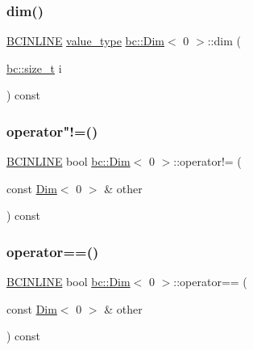 \subsubsection{\texorpdfstring{dim()}{dim()}}
{\footnotesize\ttfamily \hyperlink{common_8h_a6699e8b0449da5c0fafb878e59c1d4b1}{B\+C\+I\+N\+L\+I\+NE} \hyperlink{structbc_1_1Dim_3_010_01_4_a561dbc6acbf3e9fe5c4a06aba2f8b968}{value\+\_\+type} \hyperlink{structbc_1_1Dim}{bc\+::\+Dim}$<$ 0 $>$\+::dim (\begin{DoxyParamCaption}\item[{\hyperlink{namespacebc_aaf8e3fbf99b04b1b57c4f80c6f55d3c5}{bc\+::size\+\_\+t}}]{i }\end{DoxyParamCaption}) const\hspace{0.3cm}{\ttfamily [inline]}}

\mbox{\label{structbc_1_1Dim_3_010_01_4_a288aa95e03c09bae5cffcbbc6885138f}} 
\subsubsection{\texorpdfstring{operator"!=()}{operator!=()}}
{\footnotesize\ttfamily \hyperlink{common_8h_a6699e8b0449da5c0fafb878e59c1d4b1}{B\+C\+I\+N\+L\+I\+NE} bool \hyperlink{structbc_1_1Dim}{bc\+::\+Dim}$<$ 0 $>$\+::operator!= (\begin{DoxyParamCaption}\item[{const \hyperlink{structbc_1_1Dim}{Dim}$<$ 0 $>$ \&}]{other }\end{DoxyParamCaption}) const\hspace{0.3cm}{\ttfamily [inline]}}

\mbox{\label{structbc_1_1Dim_3_010_01_4_a096ffa430a674f7cb389ac9058ecb11b}} 
\subsubsection{\texorpdfstring{operator==()}{operator==()}}
{\footnotesize\ttfamily \hyperlink{common_8h_a6699e8b0449da5c0fafb878e59c1d4b1}{B\+C\+I\+N\+L\+I\+NE} bool \hyperlink{structbc_1_1Dim}{bc\+::\+Dim}$<$ 0 $>$\+::operator== (\begin{DoxyParamCaption}\item[{const \hyperlink{structbc_1_1Dim}{Dim}$<$ 0 $>$ \&}]{other }\end{DoxyParamCaption}) const\hspace{0.3cm}{\ttfamily [inline]}}

